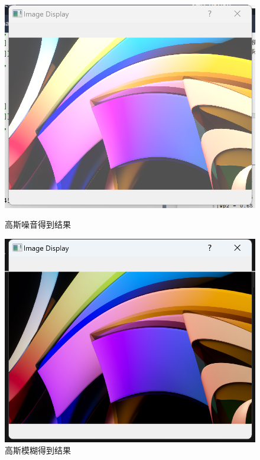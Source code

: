 \documentclass[a4paper,12pt]{article}
\begin{document}
\begin{figure}[htbp]
    \centering
    \begin{minipage}[b]{0.48\textwidth}
        \centering
        \includegraphics[width=\linewidth]{images/Design/image_processing/2/gaussian_noise.png}
        \caption{高斯噪音得到结果}
    \end{minipage}
    \hfill
    \begin{minipage}[b]{0.48\textwidth}
        \centering
        \includegraphics[width=\linewidth]{images/Design/image_processing/2/gaussian_blur.png}
        \caption{高斯模糊得到结果}
    \end{minipage}
    

\end{figure}
\end{document}
